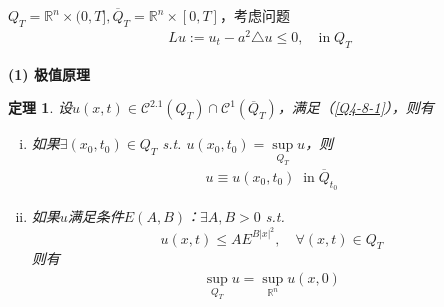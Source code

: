 \documentclass[11pt, a4paper]{article}
\theoremstyle{theorem}
\newtheorem{thm}{定理}[section]
\begin{document}
$Q_T = \mathbb{R}^n \times(0,T], \overline{Q}_T = \mathbb{R}^n \times[0,T]$，考虑问题
\begin{align}
    \label{Q4-8-1}
    L u := u_t - a^2 \triangle u \leq 0, \quad \text{in} \; Q_T
\end{align}

\textbf{(1) 极值原理}

\begin{thm}
设$u(x,t) \in \mathcal{C}^{2.1} (Q_T) \cap \mathcal{C}^1(\overline{Q}_T)$，满足（\ref{Q4-8-1}），则有
\begin{enumerate}[(i)]
  \item 如果$\exists (x_0,t_0) \in Q_T$ s.t. $u(x_0,t_0) = \sup\limits_{Q_T} u$，则
  \begin{align}
      u \equiv u(x_0,t_0) \; \; \text{in} \; \overline{Q}_{t_0}
  \end{align}
  \item 如果$u$满足条件$E(A,B)$：$\exists A,B > 0$ s.t.
  $$
  u(x,t) \leq A E^{B|x|^2}, \quad \forall (x,t) \in Q_T
  $$
  则有
  \begin{align}
      \sup\limits_{Q_T} u = \sup\limits_{\mathbb{R}^n} u(x,0)
  \end{align}
\end{enumerate}
\end{thm}
\end{document}
